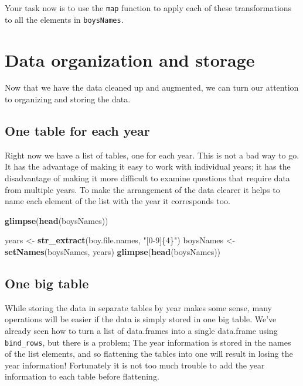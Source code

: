 \documentclass[]{book}
\newenvironment{Shaded}{\begin{snugshade}}{\end{snugshade}}
\newcommand{\KeywordTok}[1]{\textcolor[rgb]{0.13,0.29,0.53}{\textbf{#1}}}
\newcommand{\StringTok}[1]{\textcolor[rgb]{0.31,0.60,0.02}{#1}}
\newcommand{\NormalTok}[1]{#1}
\begin{document}
Your task now is to use the \texttt{map} function to apply each of these
transformations to all the elements in \texttt{boysNames}.

\section{Data organization and
storage}\label{data-organization-and-storage}

Now that we have the data cleaned up and augmented, we can turn our
attention to organizing and storing the data.

\subsection{One table for each year}\label{one-table-for-each-year}

Right now we have a list of tables, one for each year. This is not a bad
way to go. It has the advantage of making it easy to work with
individual years; it has the disadvantage of making it more difficult to
examine questions that require data from multiple years. To make the
arrangement of the data clearer it helps to name each element of the
list with the year it corresponds too.

\begin{Shaded}
\begin{Highlighting}[]
\KeywordTok{glimpse}\NormalTok{(}\KeywordTok{head}\NormalTok{(boysNames))}
\end{Highlighting}
\end{Shaded}

\begin{Shaded}
\begin{Highlighting}[]
\NormalTok{years <-}\StringTok{ }\KeywordTok{str_extract}\NormalTok{(boy.file.names, }\StringTok{"[0-9]\{4\}"}\NormalTok{)}
\NormalTok{boysNames <-}\StringTok{ }\KeywordTok{setNames}\NormalTok{(boysNames, years)}
\KeywordTok{glimpse}\NormalTok{(}\KeywordTok{head}\NormalTok{(boysNames))}
\end{Highlighting}
\end{Shaded}

\subsection{One big table}\label{one-big-table}

While storing the data in separate tables by year makes some sense, many
operations will be easier if the data is simply stored in one big table.
We've already seen how to turn a list of data.frames into a single
data.frame using \texttt{bind\_rows}, but there is a problem; The year
information is stored in the names of the list elements, and so
flattening the tables into one will result in losing the year
information! Fortunately it is not too much trouble to add the year
information to each table before flattening.
\end{document}
